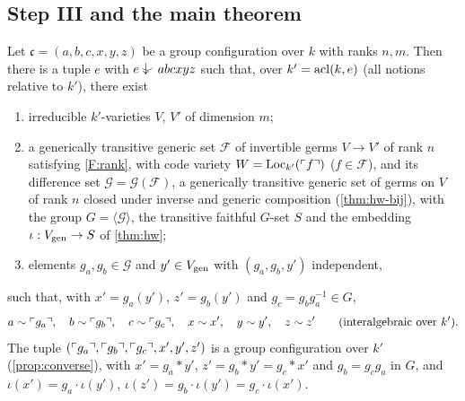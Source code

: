 \subsection{Step III and the main theorem}

\begin{theorem}\label{thm:main}
Let $\mathfrak c=(a,b,c,x,y,z)$ be a group configuration over $k$ with ranks $n,m$.  Then
there is a tuple $e$ with $e\ind{}abcxyz$ such that, over $k'=\operatorname{acl}(k,e)$ (all notions
relative to $k'$), there exist
\begin{enumerate}[nosep]
\item irreducible $k'$-varieties $V$, $V'$ of dimension $m$;
\item a generically transitive generic set $\mathcal F$ of invertible germs $V\to V'$ of
  rank $n$ satisfying \ref{F:rank}, with code variety $W=\operatorname{Loc}_{k'}(\ulcorner f\urcorner)$
  ($f\in\mathcal F$), and its difference set $\mathcal G=\mathcal G(\mathcal F)$, a
  generically transitive generic set of germs on $V$ of rank $n$ closed under inverse
  and generic composition (\cref{thm:hw-bij}), with the group $G=\langle\mathcal G\rangle$,
  the transitive faithful $G$-set $S$ and the embedding $\iota:V_{\operatorname{gen}}\to S$ of
  \cref{thm:hw};
\item elements $g_a,g_b\in\mathcal G$ and $y'\in V_{\operatorname{gen}}$ with $(g_a,g_b,y')$ independent,
\end{enumerate}
such that, with $x'=g_a(y')$, $z'=g_b(y')$ and $g_c=g_bg_a^{-1}\in G$,
\[
   a\sim\ulcorner g_a\urcorner,\quad b\sim\ulcorner g_b\urcorner,\quad c\sim\ulcorner g_c\urcorner,\quad
   x\sim x',\quad y\sim y',\quad z\sim z'
   \qquad(\text{interalgebraic over }k').
\]
The tuple $(\ulcorner g_a\urcorner,\ulcorner g_b\urcorner,\ulcorner g_c\urcorner,x',y',z')$ is a group configuration over $k'$
(\cref{prop:converse}), with $x'=g_a\ast y'$, $z'=g_b\ast y'=g_c\ast x'$ and
$g_b=g_cg_a$ in $G$, and $\iota(x')=g_a\cdot\iota(y')$, $\iota(z')=g_b\cdot\iota(y')=g_c\cdot\iota(x')$.
\end{theorem}

